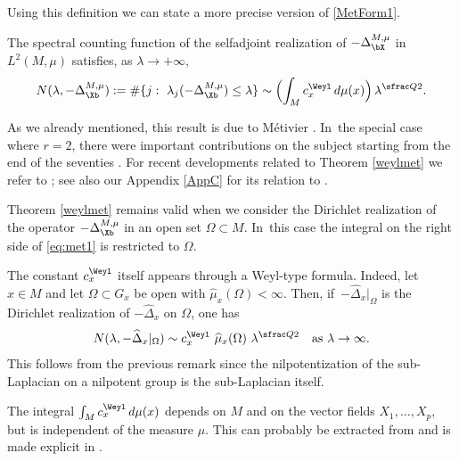 Using this definition we can state a more precise version of \eqref{MetForm1}.

\begin{theorem}\label{weylmet}
The spectral counting function of the selfadjoint realization of $-\Delta^{M,\mu}_\bX$ in $L^2(M,\mu)$ satisfies, as $\lambda\to +\infty$,
\begin{equation}\label{eq:met1}
N(\lambda,-\Delta_{\Xb}^{M,\mu}):= \# \{j:\ \lambda_j (-\Delta_{\Xb}^{M,\mu}) \leq \lambda\} \sim \Bigl(\int_M c_x^\Weyl \,d\mu(x) \Bigr)\,\lambda^{\sfrac Q2}.
\end{equation}
\end{theorem}

As we already mentioned, this result is due to Métivier \cite{Me}. In~the special case where $r=2$, there were important contributions on the subject starting from the end of the seventies \cite{MS1,MS2,Mo}. For recent developments related to Theorem \ref{weylmet} we refer to \cite{CHT0,CHT,CHT1}; see also our Appendix \ref{AppC} for its relation to \cite{CHT1}.

\begin{remark}\label{rem:weylsubsets}
Theorem \ref{weylmet} remains valid when we consider the Dirichlet realization of the operator $-\Delta_{\Xb}^{M,\mu}$ in an open set $\Omega\subset M$. In~this case the integral on the right side of \eqref{eq:met1} is restricted to $\Omega$.
\end{remark}

\begin{remark}
The constant $c_x^\Weyl$ itself appears through a Weyl-type formula. Indeed, let $x\in M$ and let $\Omega\subset G_x$ be open with $\widehat\mu_x(\Omega)<\infty$. Then, if~$-\widehat\Delta_x|_\Omega$ is the Dirichlet realization of $-\widehat \Delta_x$ on $\Omega$, one has
\[
N(\lambda,-\widehat\Delta_x|_\Omega) \sim c_x^\Weyl \ \widehat\mu_x(\Omega) \ \lambda^{\sfrac Q2}
\quad\text{as}\ \lambda\to\infty.
\]
This follows from the previous remark since the nilpotentization of the sub-Laplacian on a nilpotent group is the sub-Laplacian itself.
\end{remark}

\begin{remark}\label{rem:weylindepmeas}
The integral $\int_M c_x^\Weyl \,d\mu(x)$ depends on $M$ and on the vector fields $X_1,\ldots, X_p$, but is independent of the measure $\mu$. This can probably be extracted from \cite{Me} and is made explicit in \cite[\S 2.1]{CHT1}.
\end{remark}


